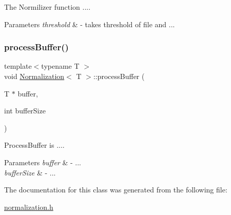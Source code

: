 The Normilizer function .... 
\begin{DoxyParams}{Parameters}
{\em threshold} & -\/ takes threshold of file and ... \\
\hline
\end{DoxyParams}
\mbox{\label{classNormalization_a8cdf89da77b8b7785f0065df8e1d9da2}} 
\subsubsection{\texorpdfstring{process\+Buffer()}{processBuffer()}}
{\footnotesize\ttfamily template$<$typename T $>$ \\
void \hyperlink{classNormalization}{Normalization}$<$ T $>$\+::process\+Buffer (\begin{DoxyParamCaption}\item[{T $\ast$}]{buffer,  }\item[{int}]{buffer\+Size }\end{DoxyParamCaption})}

Process\+Buffer is .... 
\begin{DoxyParams}{Parameters}
{\em buffer} & -\/ ... \\
\hline
{\em buffer\+Size} & -\/ ... \\
\hline
\end{DoxyParams}


The documentation for this class was generated from the following file\+:\begin{DoxyCompactItemize}
\item 
\hyperlink{normalization_8h}{normalization.\+h}\end{DoxyCompactItemize}
